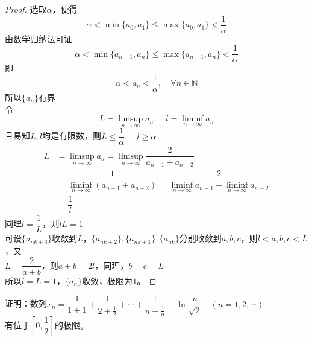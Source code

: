 \begin{proof}

    选取$\alpha$，使得
    $$\alpha < \min\{a_0,a_1\} \leq \max\{a_0,a_1\} < \dfrac{1}{\alpha}$$
    由数学归纳法可证
    $$\alpha < \min\{a_{n-1},a_n\} \leq \max\{a_{n-1},a_n\} < \dfrac{1}{\alpha}$$
    即
    $$\alpha < a_n < \dfrac{1}{\alpha},\quad \forall n\in\mathbb{N}$$
    所以$\{a_n\}$有界\\
    令
    $$L = \limsup_{n\to\infty}{a_n},\quad l = \liminf_{n\to\infty}{a_n}$$
    且易知$L,l$均是有限数，则$L \leq \dfrac{1}{\alpha},\quad l \geq \alpha$
    \begin{align*}
        L & = \limsup_{n\to\infty}{a_n} = \limsup_{n\to\infty}{\dfrac{2}{a_{n-1} + a_{n-2}}} \\
         & = \dfrac{1}{\liminf\limits_{n\to\infty}{(a_{n-1} + a_{n-2})}} = \dfrac{2}{\liminf\limits_{n\to\infty}{a_{n-1}} + \liminf\limits_{n\to\infty}{a_{n-2}}} \\ 
         &= \dfrac{1}{l}
    \end{align*}
    同理$l = \dfrac{1}{L}$，则$lL = 1$\\
    可设$\{a_{nk+3}\}$收敛到$L$，$\{a_{nk+2}\},\{a_{nk+1}\},\{a_{nk}\}$分别收敛到$a,b,c$，则$l < a,b,c < L$，又\\
    $L = \dfrac{2}{a+b} $，则$a+b = 2l $，同理，$b =c =L$\\
    所以$l = L = 1$，$\{a_n\}$收敛，极限为$1$。

\end{proof}

\begin{proposition}

    证明：数列$x_n = \dfrac{1}{1+1} + \dfrac{1}{2 + \frac{1}{2}} + \cdots + \dfrac{1}{n+\frac{1}{n}} - \ln{\dfrac{n}{\sqrt{2}}} \quad (n = 1,2,\cdots)$\\
    有位于$\left[0,\dfrac{1}{2}\right]$的极限。
    
\end{proposition}

